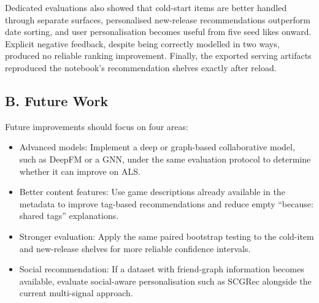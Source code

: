 \documentclass[conference]{IEEEtran}
\begin{document}
Dedicated evaluations also showed that cold-start items are better handled through separate surfaces, personalised new-release recommendations outperform date sorting, and user personalisation becomes useful from five seed likes onward. Explicit negative feedback, despite being correctly modelled in two ways, produced no reliable ranking improvement. Finally, the exported serving artifacts reproduced the notebook's recommendation shelves exactly after reload.

\subsection*{B. Future Work}

Future improvements should focus on four areas:

\begin{itemize}

\item Advanced models: Implement a deep or graph-based collaborative model, such as DeepFM or a GNN, under the same evaluation protocol to determine whether it can improve on ALS.

\end{itemize}

\begin{itemize}

\item Better content features: Use game descriptions already available in the metadata to improve tag-based recommendations and reduce empty ``because: shared tags'' explanations.

\end{itemize}

\begin{itemize}

\item Stronger evaluation: Apply the same paired bootstrap testing to the cold-item and new-release shelves for more reliable confidence intervals.

\end{itemize}

\begin{itemize}

\item Social recommendation: If a dataset with friend-graph information becomes available, evaluate social-aware personalisation such as SCGRec alongside the current multi-signal approach.

\end{itemize}
\end{document}
